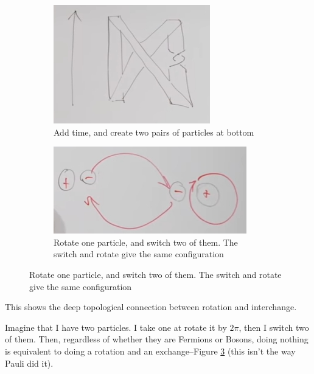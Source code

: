 \documentclass[]{article}
\begin{document}
\begin{figure}[H]
\begin{subfigure}[t]{0.24\textwidth}
	\end{subfigure}
	\begin{subfigure}[t]{0.24\textwidth}
		\caption{Add time, and create two pairs of particles at bottom}\label{fig:aqm-5-belt-legal-time}
		\includegraphics[width=\textwidth]{aqm-5-belt-legal-time}
	\end{subfigure}
	\begin{subfigure}[t]{0.24\textwidth}
		\caption{Rotate one particle, and switch two of them. The switch and rotate give the same configuration}\label{fig:belt_switch:rotate}
		\includegraphics[width=\textwidth]{aqm-5-belt-switch-rotate}
	\end{subfigure}
\end{figure}


This shows the deep topological connection between rotation and interchange.

Imagine that I have two particles. I take one at rotate it by $2\pi$, then I switch two of them. Then, regardless of whether they are Fermions or Bosons, doing nothing is equivalent to doing a rotation and an exchange--Figure \ref{fig:belt_switch:rotate} (this isn't the way Pauli did it).
\end{document}
